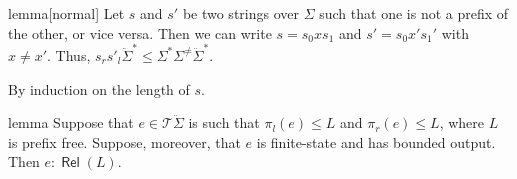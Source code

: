 \documentclass[a4paper,UKenglish,cleveref, autoref, thm-restate]{lipics-v2021}
\DeclareMathOperator{\Rel}{\mathsf{Rel}}
\begin{document}
\begin{theoremEnd}{lemma}[normal]
  \label{lem:mismatch}
  Let $s$ and $s'$ be two strings over $ \Sigma $ such that one is not a prefix of the
  other, or vice versa.  Then we can write $s = s_0xs_1$ and $s' = s_0x's_1'$
  with $x  \neq  x'$.  Thus, $s_rs'_l\ddot{ \Sigma }^*  \leq   \Sigma ^* \Sigma ^{ \neq }\ddot{ \Sigma }^*.$
\end{theoremEnd}

\begin{proofEnd}
  By induction on the length of $s$.
\end{proofEnd}

\begin{theoremEnd}{lemma}
  \label{lem:representable-sufficient}
  Suppose that $e  \in  \mathcal{T}\ddot{ \Sigma }$ is such that $ \pi _l(e)  \leq  L$ and
  $ \pi _r(e)  \leq  L$, where $L$ is prefix free.  Suppose, moreover, that $e$ is
  finite-state and has bounded output.  Then $e : \Rel(L)$.
\end{theoremEnd}
\end{document}
